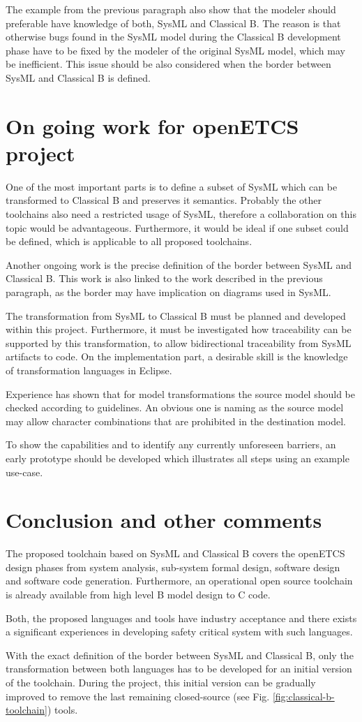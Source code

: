 The example from the previous paragraph also show that the modeler
should preferable have knowledge of both, SysML and Classical B. The
reason is that otherwise bugs found in the SysML model during the
Classical B development phase have to be fixed by the modeler of the
original SysML model, which may be inefficient. This issue should be
also considered when the border between SysML and Classical B is
defined.

\section{On going work for openETCS project}

One of the most important parts is to define a subset of SysML which
can be transformed to Classical B and preserves it semantics. Probably
the other toolchains also need a restricted usage of SysML, therefore
a collaboration on this topic would be advantageous. Furthermore, it
would be ideal if one subset could be defined, which is applicable to
all proposed toolchains.

Another ongoing work is the precise definition of the border between
SysML and Classical B. This work is also linked to the work described
in the previous paragraph, as the border may have implication on
diagrams used in SysML.

The transformation from SysML to Classical B must be planned and
developed within this project. Furthermore, it must be investigated
how traceability can be supported by this transformation, to allow
bidirectional traceability from SysML artifacts to code. On the
implementation part, a desirable skill is the knowledge of
transformation languages in Eclipse.

Experience has shown that for model transformations the source model
should be checked according to guidelines. An obvious one is naming as
the source model may allow character combinations that are prohibited
in the destination model.

To show the capabilities and to identify any currently unforeseen
barriers, an early prototype should be developed which illustrates all
steps using an example use-case.

\section{Conclusion and other comments}

The proposed toolchain based on SysML and Classical B covers the
openETCS design phases from system analysis, sub-system formal design,
software design and software code generation. Furthermore, an
operational open source toolchain is already available from high level
B model design to C code.

Both, the proposed languages and tools have industry acceptance and
there exists a significant experiences in developing safety critical
system with such languages.

With the exact definition of the border between SysML and Classical B,
only the transformation between both languages has to be developed for
an initial version of the toolchain. During the project, this initial
version can be gradually improved to remove the last remaining
closed-source (see Fig. \ref{fig:classical-b-toolchain}) tools.
